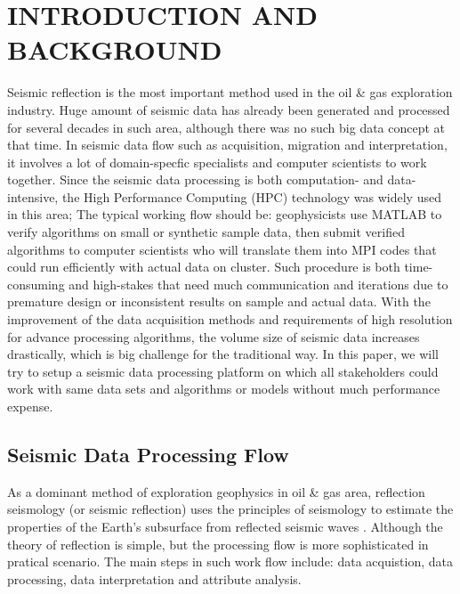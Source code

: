 %
%
%



\pagestyle{plain} %
\setcounter{page}{1}


\chapter{\uppercase {Introduction and Background}}

Seismic reflection is the most important method used in the oil \& gas exploration industry. Huge amount of seismic data has already been generated and processed for several decades in such area, although there was no such big data concept at that time. In seismic data flow such as acquisition, migration and interpretation, it involves a lot of domain-specfic specialists and computer scientists to work together. Since the seismic data processing is both computation- and data-intensive, the High Performance Computing (HPC) technology was widely used in this area; The typical working flow should be: geophysicists use MATLAB to verify algorithms on small or synthetic sample data, then submit verified algorithms to computer scientists who will translate them into MPI codes that could run efficiently with actual data on cluster. Such procedure is both time-consuming and high-stakes that need much communication and iterations due to premature design or inconsistent results on sample and actual data. With the improvement of the data acquisition methods and requirements of high resolution for advance processing algorithms, the volume size of seismic data increases drastically, which is big challenge for the traditional way. In this paper, we will try to setup a seismic data processing platform on which all stakeholders could work with same data sets and algorithms or models without much performance expense.

\section{Seismic Data Processing Flow}
As a dominant method of exploration geophysics in oil \& gas area, reflection seismology (or seismic reflection) uses the principles of seismology to estimate the properties of the Earth's subsurface from reflected seismic waves \cite{seisreflection}. Although the theory of reflection is simple, but the processing flow is more sophisticated in pratical scenario. The main steps in such work flow include: data acquistion, data processing, data interpretation and attribute analysis.

